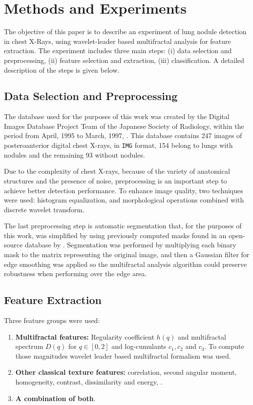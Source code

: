 \documentclass{article}
\begin{document}
	\section{Methods and Experiments}

The objective of this paper is to describe an experiment of lung nodule detection in chest X-Rays, using wavelet-leader based multifractal analysis for feature extraction. The experiment includes three main steps: (i) data selection and preprocessing, (ii) feature selection and extraction, (iii) classification. A detailed description of the steps is given below.

\subsection{Data Selection and Preprocessing}

The database used for the purposes of this work was created by the Digital Images Database Project Team of the Japanese Society of Radiology, within the period from April, 1995 to March, 1997, \citep{shiraishi2000development}. This database contains 247 images of posteroanterior digital chest X-rays, in \lstinline|IMG| format, 154 belong to lungs with nodules and the remaining 93 without nodules. 

Due to the complexity of chest X-rays, because of the variety of anatomical structures and the presence of noise, preprocessing is an important step to achieve better detection performance. To enhance image quality, two techniques were used: histogram equalization, and morphological operations combined with discrete wavelet transform. 

The last preprocessing step is automatic segmentation that, for the purposes of this work, was simplified by using previously computed masks found in an open-source database by \citep{lungsegmentationdk}. Segmentation was performed by multiplying each binary mask to the matrix representing the original image, and then a Gaussian filter for edge smoothing was applied so the multifractal analysis algorithm could preserve robustness when performing over the edge area. 


\subsection{Feature Extraction}

Three feature groups were used:

\begin{enumerate}
	\item \textbf{Multifractal features:} Regularity coefficient $h(q)$ and multifractal spectrum $D(q)$ for $q \in \left[0, 2\right]$ and log-cumulants $c_1, c_2$ and $c_3$. To compute those magnitudes wavelet leader based multifractal formalism was used.
	\item \textbf{Other classical texture features:} correlation, second angular moment, homogeneity, contrast, dissimilarity and energy, \citep{texturefeatures}.
	\item \textbf{A combination of both}. 
	
\end{enumerate}
\end{document}
